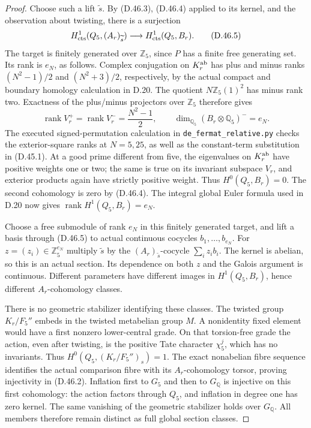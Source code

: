 \begin{proof}
Choose such a lift \(\widetilde s\).
By (D.46.3), (D.46.4) applied to its
kernel, and the observation about
twisting, there is a surjection
\[
 H^1_{\rm cts}(Q_5,(A_r)_{\widetilde s})
                   \longrightarrow H^1_{\rm cts}(Q_5,B_r).
                                                               \tag{D.46.5}
\]
The target is finitely generated over
\(\mathbb Z_5\), since \(P\) has a
finite free generating set.
Its rank is \(e_N\), as follows.
Complex conjugation on \(K_r^{\rm ab}\)
has plus and minus ranks
\((N^2-1)/2\) and \((N^2+3)/2\),
respectively, by the actual compact
and boundary homology calculation in
D.20. The quotient \(N\mathbb Z_5(1)^2\)
has minus rank two. Exactness of the
plus/minus projectors over \(\mathbb Z_5\)
therefore gives
\[
 \operatorname{rank}V_r^+
    =\operatorname{rank}V_r^-=\frac{N^2-1}{2},\qquad
 \dim_{\mathbb Q_5}(B_r\otimes\mathbb Q_5)^-=e_N .
                                                               \tag{D.46.6}
\]
The executed signed-permutation
calculation in \texttt{de\_fermat\_relative.py}
checks the exterior-square ranks
at \(N=5,25\), as well as the
constant-term substitution in
(D.45.1).
At a good prime different from five,
the eigenvalues on \(K_r^{\rm ab}\)
have positive weights one or two;
the same is true on its invariant
subspace \(V_r\), and exterior products
again have strictly positive weight.
Thus \(H^0(Q_5,B_r)=0\).
The second cohomology is zero by
(D.46.4). The integral global Euler
formula used in D.20 now gives
\(\operatorname{rank}H^1(Q_5,B_r)=e_N\).

Choose a free submodule of rank \(e_N\)
in this finitely generated target,
and lift a basis through (D.46.5)
to actual continuous cocycles
\(b_1,\ldots,b_{e_N}\).
For \(z=(z_i)\in\mathbb Z_5^{e_N}\)
multiply \(\widetilde s\) by the
\((A_r)_{\widetilde s}\)-cocycle
\(\sum_i z_i b_i\). The kernel is
abelian, so this is an actual section.
Its dependence on both \(z\) and
the Galois argument is continuous.
Different parameters have different
images in \(H^1(Q_5,B_r)\), hence
different \(A_r\)-cohomology classes.

There is no geometric stabilizer
identifying these classes. The twisted
group \(K_r/F_5''\) embeds in the
twisted metabelian group \(M\).
A nonidentity fixed element would
have a first nonzero lower-central
grade. On that torsion-free grade
the action, even after twisting,
is the positive Tate character
\(\chi_5^j\), which has no invariants.
Thus \(H^0(Q_5,(K_r/F_5'')_s)=1\).
The exact nonabelian fibre sequence
identifies the actual comparison
fibre with its \(A_r\)-cohomology
torsor, proving injectivity in
(D.46.2). Inflation first to \(G_5\)
and then to \(G_{\mathbb Q}\) is
injective on this first cohomology:
the action factors through \(Q_5\),
and inflation in degree one has
zero kernel. The same vanishing
of the geometric stabilizer holds
over \(G_{\mathbb Q}\). All members
therefore remain distinct as full
global section classes.


\end{proof}

